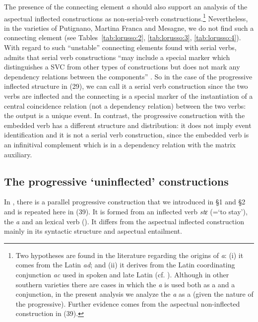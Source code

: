 \documentclass[output=paper]{langsci/langscibook}
\begin{document}
The presence of the connecting element \textit{a} should also support an analysis of the aspectual inflected constructions as non-serial-verb constructions.\footnote{Two hypotheses are found in the literature regarding the origins of \textit{a}: (i) it comes from the Latin  \textit{ad}; and (ii) it derives from the Latin coordinating conjunction \textit{ac} used in spoken and late Latin (cf. \citealt[§§710,761]{Rohlfs1969}). Although in other southern  varieties there are cases in which the \textit{a} is used both as a   and a conjunction, in the present analysis we analyze the \textit{a} as a   (given the  nature of the progressive). Further evidence comes from the aspectual non-inflected construction in (39).} Nevertheless, in the varieties of Putignano, Martina Franca and Mesagne, we do not find such a connecting element (see Tables~\ref{tab:lorusso:2}, \ref{tab:lorusso:3}, \ref{tab:lorusso:4}). With regard to such “unstable” connecting elements found with serial verbs, \citet{Aikhenvald2006} admits that serial verb constructions “may include a special marker which distinguishes a SVC from other types of constructions but does not mark any dependency relations between the components” \citep[20]{Aikhenvald2006}. So in the case of the  progressive inflected structure in (29), we can call it a serial verb construction since the two verbs are inflected and the connecting   is a special marker of the instantiation of a central coincidence relation (not a dependency relation) between the two verbs: the output is a unique event. In contrast, the progressive  construction with the embedded  verb has a different structure and distribution: it does not imply event identification and it is not a serial verb construction, since the embedded verb is an infinitival complement which is in a dependency relation with the matrix auxiliary. 

\subsection{The progressive ‘uninflected’ constructions}%

In , there is a parallel progressive construction that we introduced in §1 and §2 and is repeated here in (39). It is formed from an inflected  verb \textit{stɛ} (=‘to stay’), the   \textit{a} and an  lexical verb (). It differs from the aspectual inflected construction mainly in its syntactic structure and aspectual entailment. 
\end{document}
